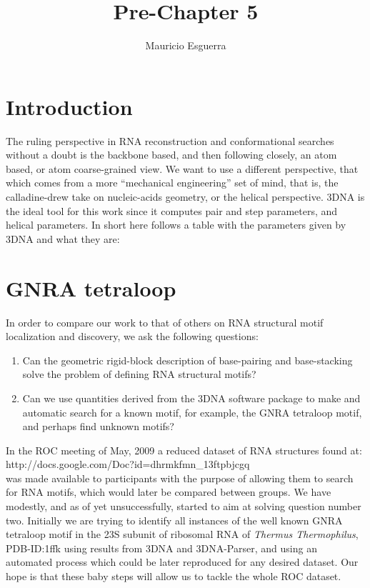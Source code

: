 \documentclass[10pt, oneside, pdftex]{article}
\begin{document}
\title{Pre-Chapter 5}
\author{Mauricio Esguerra}
\maketitle

\section{Introduction}
The  ruling  perspective  in  RNA  reconstruction  and  conformational
searches without  a doubt  is the backbone  based, and  then following
closely, an atom based, or atom coarse-grained view.  We want to use a
different  perspective,  that which  comes  from  a more  ``mechanical
engineering''   set    of   mind,   that    is,   the   calladine-drew
\cite{elhassan1995}  take  on nucleic-acids  geometry,  or the  helical
perspective. 3DNA  is the ideal tool  for this work  since it computes
pair  and  step parameters,  and  helical  parameters.  In short  here
follows a table with the parameters given by 3DNA and what they are:

\section{GNRA tetraloop}
In order to compare our work to that of others on RNA structural motif
localization and discovery, we ask the following questions:
\begin{enumerate}
\item{Can  the geometric rigid-block  description of  base-pairing and
  base-stacking solve the problem of defining RNA structural motifs?}
\item{Can we use quantities derived  from the 3DNA software package to
  make and automatic  search for a known motif,  for example, the GNRA
  tetraloop motif, and perhaps find unknown motifs?}
\end{enumerate}
In the  ROC meeting of May,  2009 a reduced dataset  of RNA structures
found  at:\\  http://docs.google.com/Doc?id=dhrmkfmn\_13ftpbjcgq\\ was
made available  to participants with  the purpose of allowing  them to
search for RNA motifs, which would later be compared between groups.
We  have modestly, and  as of  yet unsuccessfully,  started to  aim at
solving question number  two. Initially we are trying  to identify all
instances of the well known GNRA tetraloop motif in the 23S subunit of
ribosomal  RNA  of  \textit{Thermus Thermophilus},  PDB-ID:1ffk  using
results  from 3DNA  and 3DNA-Parser,  and using  an  automated process
which could be later reproduced  for any desired dataset.  Our hope is
that  these baby  steps  will allow  us to  tackle  the whole  ROC
dataset.
\end{document}
